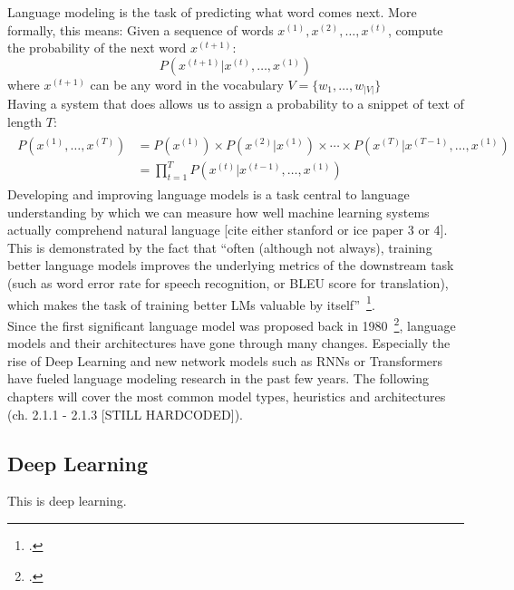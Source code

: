 Language modeling is the task of predicting what word comes next. More formally, this means:
Given a sequence of words $ x^{(1)}, x^{(2)}, \dots, x^{(t)} $, compute the probability of the next word $ x^{(t+1)} $:
\begin{equation}
    P(x^{(t+1)} | x^{(t)}, \dots, x^{(1)})
\end{equation}
where $ x^{(t+1)} $ can be any word in the vocabulary $ V = \{w_1, \dots, w_{|V|}\} $  \\
Having a system that does allows us to assign a probability to a snippet of text of length $ T $:
\begin{align}
    \begin{split}
    P(x^{(1)}, \dots, x^{(T)}) &= P(x^{(1)}) \times P(x^{(2)} | x^{(1)}) \times \cdots \times P(x^{(T)} | x^{(T-1)}, \dots, x^{(1)}) \\
    &= \prod_{t=1}^{T} P(x^{(t)} | x^{(t-1)}, \dots, x^{(1)})
    \end{split}
\end{align}
Developing and improving language models is a task central to language understanding by which we can measure how well
machine learning systems actually comprehend natural language [cite either stanford or ice paper 3 or 4].
This is demonstrated by the fact that “often (although not always), training better language models improves the
underlying metrics of the downstream task (such as word error rate for speech recognition, or BLEU
score for translation), which makes the task of training better
LMs valuable by itself”~\footcite{jozefowicz2016exploring}. \\
Since the first significant language model was proposed back in 1980~\footcite{880083}, language models and their
architectures have gone through many changes. Especially the rise of Deep Learning and new network models such as RNNs
or Transformers have fueled language modeling research in the past few years. The following chapters will cover the
most common model types, heuristics and architectures (ch. 2.1.1 - 2.1.3 [STILL HARDCODED]).








\subsection{Deep Learning}
\label{sec:deep_learning}

This is deep learning.
